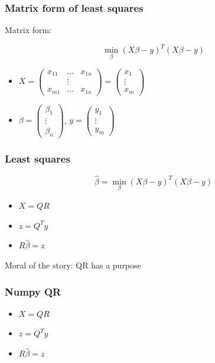 \documentclass{beamer}
\begin{document}
\begin{frame}
\frametitle{Matrix form of least squares}

Matrix form:

\[
\min_{\beta} (X\beta - y)^T(X\beta - y)
\]

\vspace{1cm}

\begin{itemize}
\setlength{\itemsep}{0.5cm}
\item $X = \begin{pmatrix} x_{11} & \hdots & x_{1n} \\ & \vdots \\ x_{m1} & \hdots & x_{1n}\end{pmatrix} = \begin{pmatrix} x_1 \\ \vdots \\ x_m \end{pmatrix}$
\item $\beta = \begin{pmatrix}\beta_1 \\ \vdots \\ \beta_n\end{pmatrix}$,
$y = \begin{pmatrix}y_1 \\ \vdots \\ y_m\end{pmatrix}$
\end{itemize}

\end{frame}

\begin{frame}
\frametitle{Least squares}

\[
\hat{\beta} = \min_{\beta} (X\beta - y)^T(X\beta - y)
\]

\begin{itemize}
\item $X = QR$
\item $z = Q^Ty$
\item $R\hat{\beta} = z$
\end{itemize}

\vspace{1cm}

Moral of the story: QR has a purpose

\end{frame}

\begin{frame}
\frametitle{Numpy QR}

\begin{itemize}
\item $X = QR$
\item $z = Q^Ty$
\item $R\hat{\beta} = z$
\end{itemize}


\end{frame}
\end{document}

